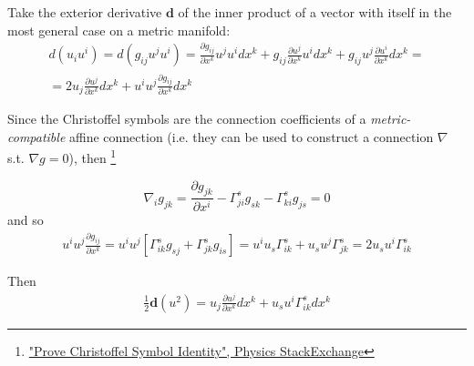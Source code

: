 \documentclass[10pt]{amsart}
\begin{document}
\begin{multicols*}{2}

Take the exterior derivative $\mathbf{d}$ of the inner product of a vector with itself in the most general case on a metric manifold:
\[
\begin{gathered}
d(u_i u^i) = d(g_{ij} u^j u^i) = \frac{ \partial g_{ij} }{ \partial x^k} u^j u^i dx^k  + g_{ij} \frac{ \partial u^j}{ \partial x^k} u^i dx^k + g_{ij} u^j \frac{\partial u^i}{\partial x^k} dx^k = \\
= 2 u_j \frac{ \partial u^j}{\partial x^k} dx^k + u^i u^j \frac{\partial g_{ij}}{\partial x^k} dx^k 
\end{gathered}
\]


Since the Christoffel symbols are the connection coefficients of a \emph{metric-compatible} affine connection (i.e. they can be used to construct a connection $\nabla$ s.t. $\nabla g = 0$), then \footnote{ \href{https://physics.stackexchange.com/questions/175235/prove-christoffel-symbol-identity}{"Prove Christoffel Symbol Identity", Physics StackExchange}}

\begin{equation}
\nabla_i g_{jk} = \frac{ \partial g_{jk}}{\partial x^i} - \Gamma^s_{ji} g_{sk} - \Gamma^s_{ki} g_{js} = 0
\end{equation}
and so
\begin{equation}
\begin{gathered}
 u^i u^j \frac{ \partial g_{ij}}{\partial x^k} = u^i u^j \left[ \Gamma^s_{ik} g_{sj} + \Gamma^s_{jk} g_{is} \right] = u^i u_s \Gamma^s_{ik} + u_s u^j \Gamma^s_{jk} = 2u_s u^i \Gamma^s_{ik}
\end{gathered}
\end{equation}


Then 
\begin{equation}\label{Eq:ExteriorDerivativeOfMagnitudeSquareOfVector}
\begin{gathered}
\frac{1}{2} \mathbf{d}(u^2) = u_j \frac{ \partial u^j}{\partial x^k} dx^k + u_s u^i \Gamma^s_{ik} dx^k
\end{gathered}
\end{equation}


\end{multicols*}
\end{document}
